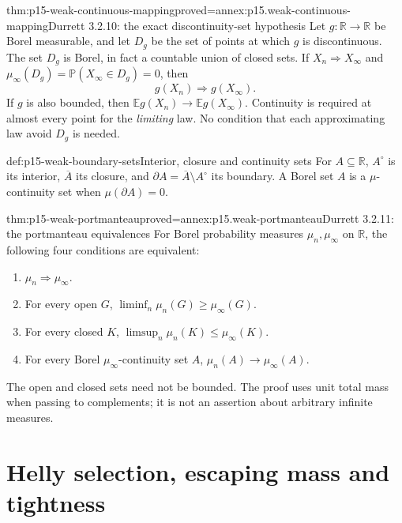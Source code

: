 \begin{hbtheorem}{thm:p15-weak-continuous-mapping}{proved=annex:p15.weak-continuous-mapping}{Durrett 3.2.10: the exact discontinuity-set hypothesis}
Let \(g:\mathbb R\to\mathbb R\) be Borel measurable, and let
\(D_g\) be the set of points at which \(g\) is discontinuous.
The set \(D_g\) is Borel, in fact a countable union of closed sets.
If \(X_n\Rightarrow X_\infty\) and
\(\mu_\infty(D_g)=\mathbb P(X_\infty\in D_g)=0\), then
\[
 g(X_n)\Rightarrow g(X_\infty).
\]
If \(g\) is also bounded, then
\(\mathbb E g(X_n)\to\mathbb E g(X_\infty)\).
Continuity is required at almost every point for the \emph{limiting}
law. No condition that each approximating law avoid \(D_g\) is needed.
\end{hbtheorem}

\begin{hbdefinition}{def:p15-weak-boundary-sets}{Interior, closure and continuity sets}
For \(A\subseteq\mathbb R\), \(A^\circ\) is its interior,
\(\overline A\) its closure, and
\(\partial A=\overline A\setminus A^\circ\) its boundary.
A Borel set \(A\) is a \(\mu\)-continuity set when
\(\mu(\partial A)=0\).
\end{hbdefinition}

\begin{hbtheorem}{thm:p15-weak-portmanteau}{proved=annex:p15.weak-portmanteau}{Durrett 3.2.11: the portmanteau equivalences}
For Borel probability measures \(\mu_n,\mu_\infty\) on
\(\mathbb R\), the following four conditions are equivalent:
\begin{enumerate}
\item \(\mu_n\Rightarrow\mu_\infty\).
\item For every open \(G\),
\(\liminf_n\mu_n(G)\geq\mu_\infty(G)\).
\item For every closed \(K\),
\(\limsup_n\mu_n(K)\leq\mu_\infty(K)\).
\item For every Borel \(\mu_\infty\)-continuity set \(A\),
\(\mu_n(A)\to\mu_\infty(A)\).
\end{enumerate}
The open and closed sets need not be bounded. The proof uses
unit total mass when passing to complements; it is not an
assertion about arbitrary infinite measures.
\end{hbtheorem}

\section{Helly selection, escaping mass and tightness}
\label{sec:p15-weak-selection-and-tightness}

